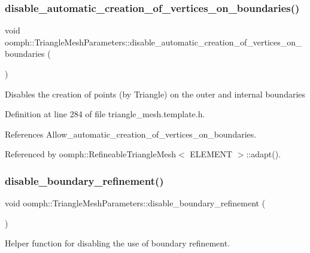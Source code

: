 \subsubsection{\texorpdfstring{disable\+\_\+automatic\+\_\+creation\+\_\+of\+\_\+vertices\+\_\+on\+\_\+boundaries()}{disable\_automatic\_creation\_of\_vertices\_on\_boundaries()}}
{\footnotesize\ttfamily void oomph\+::\+Triangle\+Mesh\+Parameters\+::disable\+\_\+automatic\+\_\+creation\+\_\+of\+\_\+vertices\+\_\+on\+\_\+boundaries (\begin{DoxyParamCaption}{ }\end{DoxyParamCaption})\hspace{0.3cm}{\ttfamily [inline]}}

Disables the creation of points (by Triangle) on the outer and internal boundaries 

Definition at line 284 of file triangle\+\_\+mesh.\+template.\+h.



References Allow\+\_\+automatic\+\_\+creation\+\_\+of\+\_\+vertices\+\_\+on\+\_\+boundaries.



Referenced by oomph\+::\+Refineable\+Triangle\+Mesh$<$ E\+L\+E\+M\+E\+N\+T $>$\+::adapt().

\mbox{\label{classoomph_1_1TriangleMeshParameters_adeadc9819399414beb7ef5523045c58c}} 
\subsubsection{\texorpdfstring{disable\+\_\+boundary\+\_\+refinement()}{disable\_boundary\_refinement()}}
{\footnotesize\ttfamily void oomph\+::\+Triangle\+Mesh\+Parameters\+::disable\+\_\+boundary\+\_\+refinement (\begin{DoxyParamCaption}{ }\end{DoxyParamCaption})\hspace{0.3cm}{\ttfamily [inline]}}



Helper function for disabling the use of boundary refinement. 



